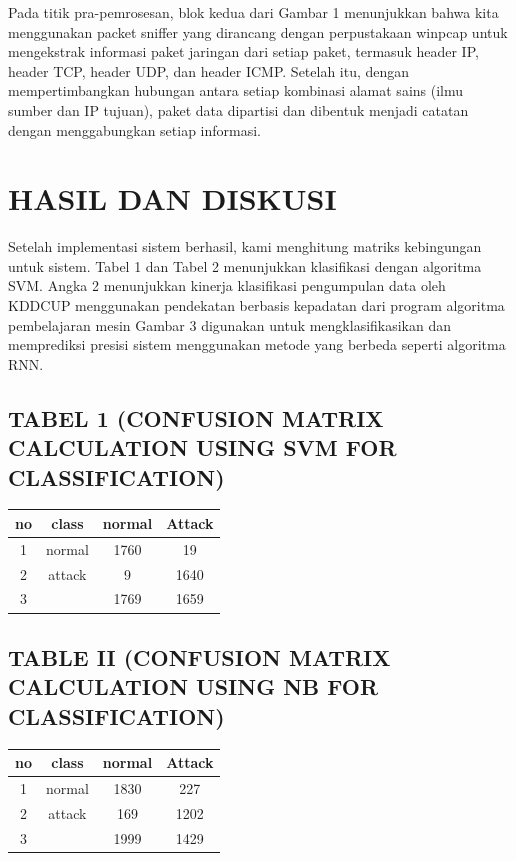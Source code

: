 \documentclass[conference]{IEEEtran}
\begin{document}
Pada titik pra-pemrosesan, blok kedua dari Gambar 1 menunjukkan bahwa kita menggunakan packet sniffer yang dirancang dengan perpustakaan winpcap untuk mengekstrak informasi paket jaringan dari setiap paket, termasuk header IP, header TCP, header UDP, dan header ICMP. Setelah itu, dengan mempertimbangkan hubungan antara setiap kombinasi alamat sains (ilmu sumber dan IP tujuan), paket data dipartisi dan dibentuk menjadi catatan dengan menggabungkan setiap informasi.

\section{HASIL DAN DISKUSI}

Setelah implementasi sistem berhasil, kami menghitung matriks kebingungan untuk sistem. Tabel 1 dan Tabel 2 menunjukkan klasifikasi dengan algoritma SVM. Angka
2 menunjukkan kinerja klasifikasi pengumpulan data oleh KDDCUP menggunakan pendekatan berbasis kepadatan dari program algoritma pembelajaran mesin Gambar 3 digunakan untuk mengklasifikasikan dan memprediksi presisi sistem menggunakan
metode yang berbeda seperti algoritma RNN.

\subsection{TABEL 1 (CONFUSION MATRIX CALCULATION USING SVM FOR CLASSIFICATION)}

\begin{table}[H]
\begin{tabular}{|c|c|c|c|}
\hline
no & class & normal & Attack\\
\hline
1   & normal & 1760 & 19\\
\hline
2   & attack & 9 & 1640\\
\hline
3   &  & 1769 & 1659 \\
\hline
\end{tabular}
\end{table}

\subsection{TABLE II (CONFUSION MATRIX CALCULATION USING NB FOR CLASSIFICATION)}

\begin{table}[H]
\begin{tabular}{|c|c|c|c|}
\hline
no & class & normal & Attack\\
\hline
1   & normal & 1830 & 227\\
\hline
2   & attack & 169 & 1202\\
\hline
3   &  & 1999 & 1429 \\
\hline
\end{tabular}
\end{table}
\end{document}

